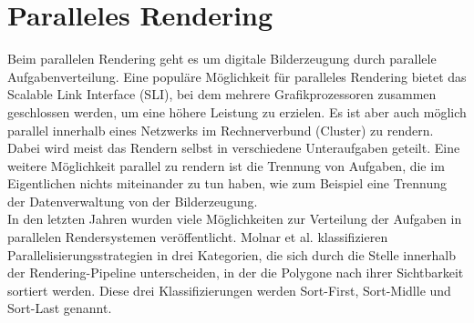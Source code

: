 \section{Paralleles Rendering}
\label{sec:relwork:parrender}
Beim parallelen Rendering geht es um digitale Bilderzeugung durch parallele Aufgabenverteilung. Eine populäre Möglichkeit für paralleles Rendering bietet das Scalable Link Interface (SLI), bei dem mehrere Grafikprozessoren zusammen geschlossen werden, um eine höhere Leistung zu erzielen. Es ist aber auch möglich parallel innerhalb eines Netzwerks im Rechnerverbund (Cluster) zu rendern. Dabei wird meist das Rendern selbst in verschiedene Unteraufgaben geteilt. Eine weitere Möglichkeit parallel zu rendern ist die Trennung von Aufgaben, die im Eigentlichen nichts miteinander zu tun haben, wie zum Beispiel eine Trennung der Datenverwaltung von der Bilderzeugung.\\
In den letzten Jahren wurden viele Möglichkeiten zur Verteilung der Aufgaben in parallelen Rendersystemen veröffentlicht. Molnar et al. \cite{molnar} klassifizieren Parallelisierungsstrategien in drei Kategorien, die sich durch die Stelle innerhalb der Rendering-Pipeline unterscheiden, in der die Polygone nach ihrer Sichtbarkeit sortiert werden. Diese drei Klassifizierungen werden Sort-First, Sort-Midlle und Sort-Last genannt.

